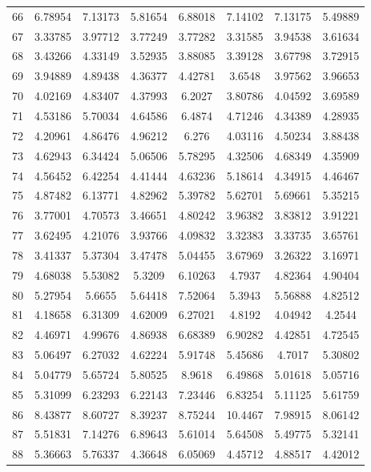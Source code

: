 \begin{center}
\begin{longtable}{cccccccc}
66 & 6.78954 & 7.13173 & 5.81654 & 6.88018 & 7.14102 & 7.13175 & 5.49889\\
67 & 3.33785 & 3.97712 & 3.77249 & 3.77282 & 3.31585 & 3.94538 & 3.61634\\
68 & 3.43266 & 4.33149 & 3.52935 & 3.88085 & 3.39128 & 3.67798 & 3.72915\\
69 & 3.94889 & 4.89438 & 4.36377 & 4.42781 & 3.6548 & 3.97562 & 3.96653\\
70 & 4.02169 & 4.83407 & 4.37993 & 6.2027 & 3.80786 & 4.04592 & 3.69589\\
71 & 4.53186 & 5.70034 & 4.64586 & 6.4874 & 4.71246 & 4.34389 & 4.28935\\
72 & 4.20961 & 4.86476 & 4.96212 & 6.276 & 4.03116 & 4.50234 & 3.88438\\
73 & 4.62943 & 6.34424 & 5.06506 & 5.78295 & 4.32506 & 4.68349 & 4.35909\\
74 & 4.56452 & 6.42254 & 4.41444 & 4.63236 & 5.18614 & 4.34915 & 4.46467\\
75 & 4.87482 & 6.13771 & 4.82962 & 5.39782 & 5.62701 & 5.69661 & 5.35215\\
76 & 3.77001 & 4.70573 & 3.46651 & 4.80242 & 3.96382 & 3.83812 & 3.91221\\
77 & 3.62495 & 4.21076 & 3.93766 & 4.09832 & 3.32383 & 3.33735 & 3.65761\\
78 & 3.41337 & 5.37304 & 3.47478 & 5.04455 & 3.67969 & 3.26322 & 3.16971\\
79 & 4.68038 & 5.53082 & 5.3209 & 6.10263 & 4.7937 & 4.82364 & 4.90404\\
80 & 5.27954 & 5.6655 & 5.64418 & 7.52064 & 5.3943 & 5.56888 & 4.82512\\
81 & 4.18658 & 6.31309 & 4.62009 & 6.27021 & 4.8192 & 4.04942 & 4.2544\\
82 & 4.46971 & 4.99676 & 4.86938 & 6.68389 & 6.90282 & 4.42851 & 4.72545\\
83 & 5.06497 & 6.27032 & 4.62224 & 5.91748 & 5.45686 & 4.7017 & 5.30802\\
84 & 5.04779 & 5.65724 & 5.80525 & 8.9618 & 6.49868 & 5.01618 & 5.05716\\
85 & 5.31099 & 6.23293 & 6.22143 & 7.23446 & 6.83254 & 5.11125 & 5.61759\\
86 & 8.43877 & 8.60727 & 8.39237 & 8.75244 & 10.4467 & 7.98915 & 8.06142\\
87 & 5.51831 & 7.14276 & 6.89643 & 5.61014 & 5.64508 & 5.49775 & 5.32141\\
88 & 5.36663 & 5.76337 & 4.36648 & 6.05069 & 4.45712 & 4.88517 & 4.42012\\

\end{longtable}
\end{center}
